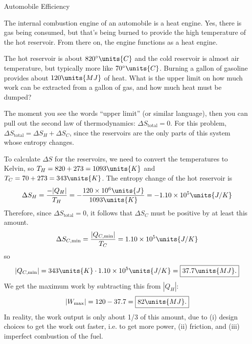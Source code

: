 \begin{example}{Automobile Efficiency}

\label{example:automobile_efficiency}

The internal combustion engine of an automobile is a heat engine.
Yes, there is gas being consumed, but that's being burned to provide
the high temperature of the hot reservoir.  From there on, the engine
functions as a heat engine.  

The hot reservoir is about $820^\circ\units{C}$ and the cold reservoir
is almost air temperature, but typically more like
$70^\circ\units{C}$.  Burning a gallon of gasoline provides about
$120\units{MJ}$ of heat.  What is the upper limit on how much work can
be extracted from a gallon of gas, and how much heat must be dumped?

\solution The moment you see the words ``upper limit'' (or similar
language), then you can pull out the second law of thermodynamics:
$\Delta S_\text{total} = 0$.  For this problem, $\Delta S_\text{total}
= \Delta S_H + \Delta S_C$, since the reservoirs are the
only parts of this system whose entropy changes.

To calculate $\Delta S$ for the reservoirs, we need to convert the
temperatures to Kelvin, so $T_H=820+273=1093\units{K}$ and
$T_C=70+273=343\units{K}$.  The entropy change of the hot reservoir is
\begin{equation}
\Delta S_H = \frac{-|Q_H|}{T_H} = 
-\frac{120\times 10^6\units{J}}{1093\units{K}}
 = -1.10\times 10^{5}\units{J/K}
\end{equation}
Therefore, since $\Delta S_\text{total} = 0$, it follows that  
$\Delta S_C$ must be positive by at least this amount.
\begin{equation}
\Delta S_{C,{\rm min}} = \frac{|Q_{C,{\rm min}}|}{T_C} = 1.10\times
10^5\units{J/K}
\end{equation}
so
\begin{equation}
|Q_{C,{\rm min}}| = 343\units{K} \cdot 1.10\times 10^{5}\units{J/K} =
\boxed{37.7\units{MJ}.}
\end{equation}
We get the maximum work by subtracting this from $|Q_H|$:
\begin{equation}
|W_\text{max}| = 120 - 37.7 = \boxed{82\units{MJ}.}
\end{equation}
In reality, the work output is only about 1/3 of this amount, due to
(i) design choices to get the work out faster, i.e. to get more power,
(ii) friction, and (iii) imperfect combustion of the fuel.
\end{example}

